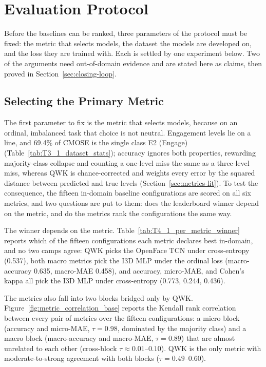 \documentclass[../main.tex]{subfiles}
\begin{document}
\FloatBarrier
\section{Evaluation Protocol}
\label{sec:protocol}

Before the baselines can be ranked, three parameters of the protocol must be fixed: the metric that selects models, the dataset the models are developed on, and the loss they are trained with. Each is settled by one experiment below. Two of the arguments need out-of-domain evidence and are stated here as claims, then proved in Section~\ref{sec:closing-loop}.

\subsection{Selecting the Primary Metric}
\label{sec:protocol-metrics}

The first parameter to fix is the metric that selects models, because on an ordinal, imbalanced task that choice is not neutral. Engagement levels lie on a line, and 69.4\% of CMOSE is the single class E2 (Engage) (Table~\ref{tab:T3_1_dataset_stats}); accuracy ignores both properties, rewarding majority-class collapse and counting a one-level miss the same as a three-level miss, whereas QWK is chance-corrected and weights every error by the squared distance between predicted and true levels (Section~\ref{sec:metrics-lit}). To test the consequence, the fifteen in-domain baseline configurations are scored on all six metrics, and two questions are put to them: does the leaderboard winner depend on the metric, and do the metrics rank the configurations the same way.

The winner depends on the metric. Table~\ref{tab:T4_1_per_metric_winner} reports which of the fifteen configurations each metric declares best in-domain, and no two camps agree: QWK picks the OpenFace TCN under cross-entropy (0.537), both macro metrics pick the I3D MLP under the ordinal loss (macro-accuracy 0.635, macro-MAE 0.458), and accuracy, micro-MAE, and Cohen's kappa all pick the I3D MLP under cross-entropy (0.773, 0.244, 0.436).


The metrics also fall into two blocks bridged only by QWK. Figure~\ref{fig:metric_correlation_base} reports the Kendall rank correlation between every pair of metrics over the fifteen configurations: a micro block (accuracy and micro-MAE, $\tau=0.98$, dominated by the majority class) and a macro block (macro-accuracy and macro-MAE, $\tau=0.89$) that are almost unrelated to each other (cross-block $\tau\approx0.01$--$0.10$). QWK is the only metric with moderate-to-strong agreement with both blocks ($\tau=0.49$--$0.60$).
\end{document}
